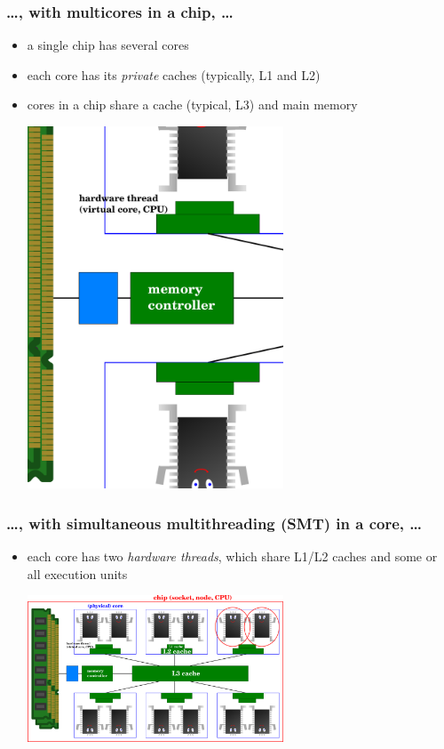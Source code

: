 \documentclass[12pt,dvipdfmx]{beamer}
\newcommand{\ao}[1]{{\color{blue}#1}}
\begin{document}
\begin{frame}
\frametitle{\ldots , with multicores in a chip, \ldots}
\begin{itemize}
\item a single chip has several cores
\item each core has its \ao{\em private} caches (typically, L1 and L2)
\item cores in a chip share a cache (typical, L3) and main memory

\begin{center}
\includegraphics[width=0.6\textwidth]{out/pdf/svg/diagram_multicore.pdf}
\end{center}
\end{itemize}

\end{frame}

\begin{frame}
\frametitle{\ldots , with simultaneous multithreading (SMT) in a core, \ldots}
\begin{itemize}
\item each core has two \ao{\em hardware threads}, which share
  L1/L2 caches and some or all execution units

\begin{center}
\includegraphics[width=0.6\textwidth]{out/pdf/svg/diagram_smt.pdf}
\end{center}

\end{itemize}
\end{frame}
\end{document}

